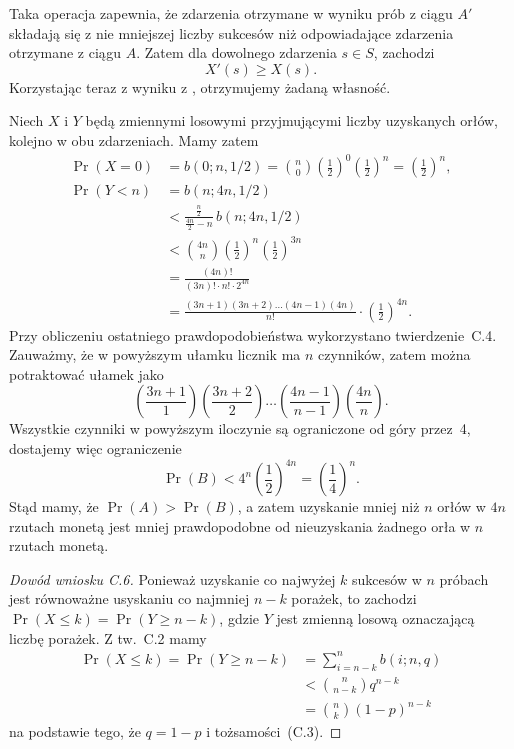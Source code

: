Taka operacja zapewnia, że zdarzenia otrzymane w wyniku prób z ciągu $A'$ składają się z nie mniejszej liczby sukcesów niż odpowiadające zdarzenia otrzymane z ciągu $A$. Zatem dla dowolnego zdarzenia $s\in S$, zachodzi
\[
	X'(s) \ge X(s).
\]
Korzystając teraz z wyniku z , otrzymujemy żadaną własność.


\exercise{} %
Niech $X$ i $Y$ będą zmiennymi losowymi przyjmującymi liczby uzyskanych orłów, kolejno w obu zdarzeniach. Mamy zatem
\begin{align*}
	\Pr(X=0) &= b(0;n,1/2) = \binom{n}{0}\left(\frac{1}{2}\right)^0\left(\frac{1}{2}\right)^n = \left(\frac{1}{2}\right)^n, \\
	\Pr(Y<n) &= b(n;4n,1/2) \\
	&< \frac{\frac{n}{2}}{\frac{4n}{2}-n}\,b(n;4n,1/2) \\
	&< \binom{4n}{n}\left(\frac{1}{2}\right)^n\left(\frac{1}{2}\right)^{3n} \\
	&= \frac{(4n)!}{(3n)!\cdot n!\cdot 2^{4n}} \\
	&= \frac{(3n+1)(3n+2)\dots(4n-1)(4n)}{n!}\cdot\left(\frac{1}{2}\right)^{4n}.
\end{align*}
Przy obliczeniu ostatniego prawdopodobieństwa wykorzystano twierdzenie~C.4. Zauważmy, że w powyższym ułamku licznik ma $n$ czynników, zatem można potraktować ułamek jako
\[
	\left(\frac{3n+1}{1}\right)\left(\frac{3n+2}{2}\right)\dots\left(\frac{4n-1}{n-1}\right)\left(\frac{4n}{n}\right).
\]
Wszystkie czynniki w powyższym iloczynie są ograniczone od góry przez~4, dostajemy więc ograniczenie
\[
	\Pr(B) < 4^n\left(\frac{1}{2}\right)^{4n} = \left(\frac{1}{4}\right)^n.
\]
Stąd mamy, że $\Pr(A)>\Pr(B)$, a zatem uzyskanie mniej niż $n$ orłów w $4n$ rzutach monetą jest mniej prawdopodobne od nieuzyskania żadnego orła w $n$ rzutach monetą.

\exercise{} %
\begin{proof}[Dowód wniosku C.6]
	Ponieważ uzyskanie co najwyżej $k$ sukcesów w $n$ próbach jest równoważne usyskaniu co najmniej $n-k$ porażek, to zachodzi $\Pr(X\le k)=\Pr(Y\ge n-k)$, gdzie $Y$ jest zmienną losową oznaczającą liczbę porażek. Z tw.~C.2 mamy
	\begin{align*}
		\Pr(X\le k) = \Pr(Y\ge n-k) &= \sum_{i=n-k}^nb(i;n,q) \\
		&< \binom{n}{n-k}q^{n-k} \\
		&= \binom{n}{k}(1-p)^{n-k}
	\end{align*}
	na podstawie tego, że $q=1-p$ i tożsamości~(C.3).
\end{proof}

